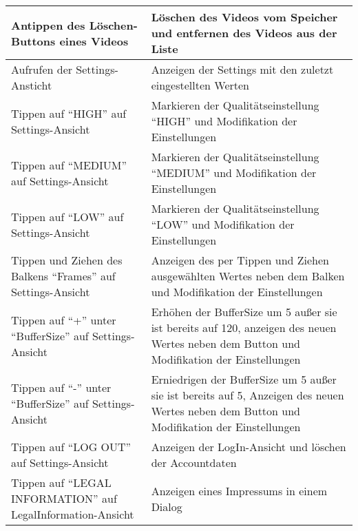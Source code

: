 \begin{longtable}{p{} | p{}}
\hline
Antippen des Löschen-Buttons eines Videos & Löschen des Videos vom Speicher und entfernen des Videos aus der Liste\\
\hline
Aufrufen der Settings-Ansticht & Anzeigen der Settings mit den zuletzt eingestellten Werten\\
\hline
Tippen auf ``HIGH'' auf Settings-Ansicht & Markieren der Qualitätseinstellung ``HIGH'' und Modifikation der Einstellungen\\
\hline
Tippen auf ``MEDIUM'' auf Settings-Ansicht & Markieren der Qualitätseinstellung ``MEDIUM'' und Modifikation der Einstellungen\\
\hline
Tippen auf ``LOW'' auf Settings-Ansicht & Markieren der Qualitätseinstellung ``LOW'' und Modifikation der Einstellungen\\
\hline
Tippen und Ziehen des Balkens ``Frames'' auf Settings-Ansicht & Anzeigen des per Tippen und Ziehen ausgewählten Wertes neben dem Balken und Modifikation der Einstellungen\\
\hline
Tippen auf ``+'' unter ``BufferSize'' auf Settings-Ansicht & Erhöhen der BufferSize um 5 außer sie ist bereits auf 120, anzeigen des neuen Wertes neben dem Button und Modifikation der Einstellungen\\
\hline
Tippen auf ``-'' unter ``BufferSize'' auf Settings-Ansicht & Erniedrigen der BufferSize um 5 außer sie ist bereits auf 5, Anzeigen des neuen Wertes neben dem Button und Modifikation der Einstellungen\\
\hline
Tippen auf ``LOG OUT'' auf Settings-Ansicht & Anzeigen der LogIn-Ansicht und löschen der Accountdaten\\
\hline
Tippen auf ``LEGAL INFORMATION'' auf LegalInformation-Ansicht & Anzeigen eines Impressums in einem Dialog\\
\hline

\end{longtable}
                                                      
